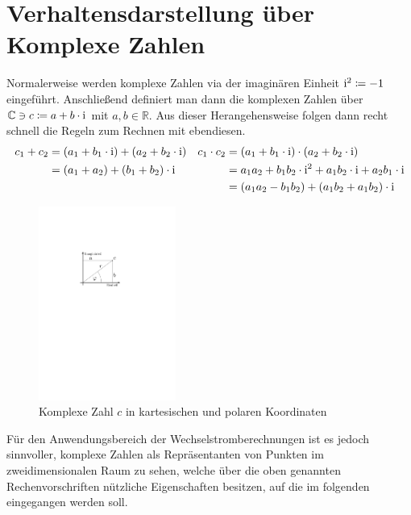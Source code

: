\section{Verhaltensdarstellung über Komplexe Zahlen}
Normalerweise werden komplexe Zahlen via der imaginären Einheit $\mathrm{i}^2 \coloneqq -1$ eingeführt.
Anschließend definiert man dann die komplexen Zahlen über $\mathbb{C} \ni c \coloneqq a + b\cdot \mathrm{i}$ mit $a,b \in \mathbb{R}$.
Aus dieser Herangehensweise folgen dann recht schnell die Regeln zum Rechnen mit ebendiesen.
\begin{align*}
    c_1 +c_2 &= (a_1 + b_1\cdot \mathrm{i}) + (a_2 + b_2\cdot \mathrm{i}) &
    c_1 \cdot c_2 &= (a_1 + b_1\cdot \mathrm{i}) \cdot (a_2 + b_2\cdot \mathrm{i}) \\
        &= (a_1 + a_2) + (b_1 + b_2)\cdot \mathrm{i}  &
        &= a_1a_2 + b_1b_2 \cdot \mathrm{i}^2 + a_1b_2 \cdot \mathrm{i} + a_2b_1 \cdot \mathrm{i}\\
        &&&= (a_1a_2 - b_1b_2) + (a_1b_2 + a_1b_2) \cdot \mathrm{i}
\end{align*}

\begin{figure}
  \begin{centering}
    \includegraphics[width=0.4\textwidth]{philip1.pdf}
  \end{centering}
  \caption{Komplexe Zahl $c$ in kartesischen und polaren Koordinaten}
\end{figure}

Für den Anwendungsbereich der Wechselstromberechnungen ist es jedoch sinnvoller, komplexe Zahlen als
Repräsentanten von Punkten im zweidimensionalen Raum zu sehen, welche über die oben genannten Rechenvorschriften nützliche Eigenschaften besitzen, auf die im folgenden eingegangen werden soll.

